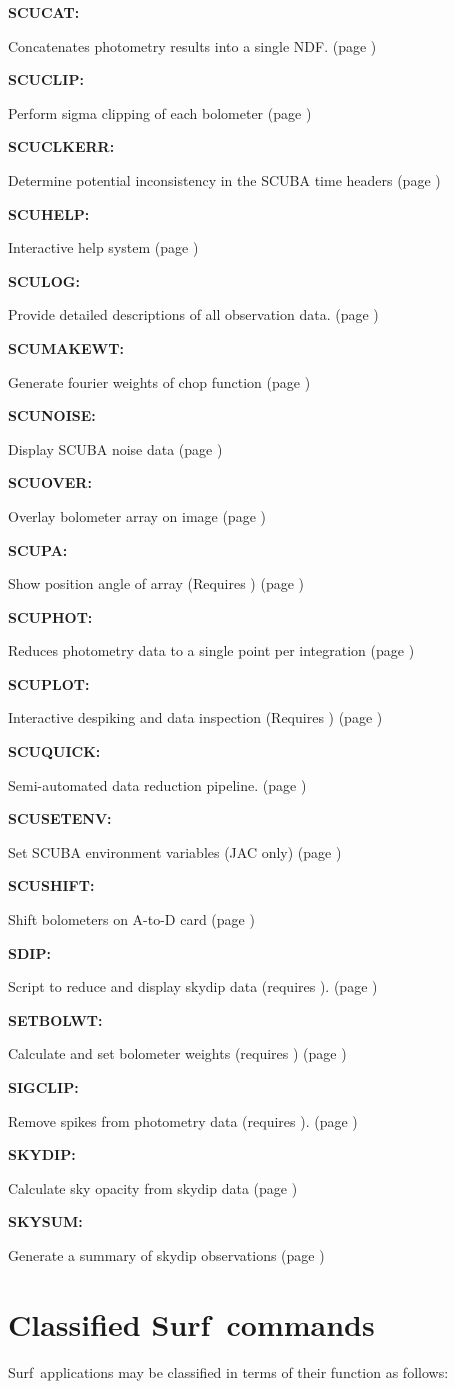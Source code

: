 \documentclass[twoside,11pt]{article}
\newcommand{\scusoft}          {{\sc Surf}}
\newcommand{\Kappa}{\xref{{\sc{Kappa}}}{sun95}{}}
\newcommand{\quickdes}[3]{
\item \textbf{#1:} {\raggedright  #2 (page \pageref{#3})}}
\newcommand{\xref}[3]{#1}
\newcommand{\xlabel}[1]{}
\renewcommand{\_}{\texttt{\symbol{95}}}
\begin{document}
\begin{description}
\quickdes{SCUCAT}{Concatenates photometry results into a single NDF.}{surf:scucat}
\quickdes{SCUCLIP}{Perform sigma clipping of each bolometer}{surf:scuclip}
\quickdes{SCUCLKERR}{Determine potential inconsistency in the SCUBA time headers}{surf:scuclkerr}
\quickdes{SCUHELP}{Interactive help system}{surf:scuhelp}
\quickdes{SCULOG}{Provide detailed descriptions of all observation data.}{surf:sculog}
\quickdes{SCUMAKEWT}{Generate fourier weights of chop function}{surf:scumakewt}
\quickdes{SCUNOISE}{Display SCUBA noise data}{surf:scunoise}
\quickdes{SCUOVER}{Overlay bolometer array on image}{surf:scuover}
\quickdes{SCUPA}{Show position angle of array (Requires \Kappa)}{surf:scupa}
\quickdes{SCUPHOT}{Reduces photometry data to a single point per integration}{surf:scuphot}
\quickdes{SCUPLOT}{Interactive despiking and data inspection (Requires \Kappa)}{surf:scuplot}
\quickdes{SCUQUICK}{Semi-automated data reduction pipeline.}{surf:scuquick}
\quickdes{SCUSETENV}{Set SCUBA environment variables (JAC only)}{surf:scusetenv}
\quickdes{SCUSHIFT}{Shift bolometers on A-to-D card}{surf:scushift}
\quickdes{SDIP}{Script to reduce and display skydip data (requires \Kappa).}{surf:sdip}
\quickdes{SETBOLWT}{Calculate and set bolometer weights (requires \Kappa)}{surf:setbolwt}
\quickdes{SIGCLIP}{Remove spikes from photometry data (requires \Kappa).}{surf:sigclip}
\quickdes{SKYDIP}{Calculate sky opacity from skydip data}{surf:skydip}
\quickdes{SKYSUM}{Generate a summary of skydip observations}{surf:skysum}
\end{description}


\section{\xlabel{classified}Classified \scusoft\ commands\label{classified}}

\scusoft\ applications may be classified in terms of their function as 
follows:
\end{document}
